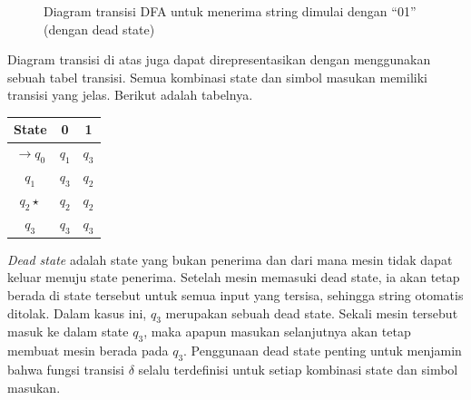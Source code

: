 \begin{figure}[H]
    \centering
    \caption{Diagram transisi DFA untuk menerima string dimulai dengan ``01'' (dengan dead state)}
    \label{fig:dfa-starts-with-01}
\end{figure}

Diagram transisi di atas juga dapat direpresentasikan dengan menggunakan sebuah tabel transisi. Semua kombinasi state dan simbol masukan memiliki transisi yang jelas. Berikut adalah tabelnya.

\begin{center}
    \small
    \setlength{\extrarowheight}{2pt}
    \begin{tabular}{|c|c|c|}
        \hline
        \textbf{State}    & \textbf{0} & \textbf{1} \\
        \hline
        $\rightarrow q_0$ & $q_1$      & $q_3$      \\
        \hline
        $q_1$             & $q_3$      & $q_2$      \\
        \hline
        $q_2\star$        & $q_2$      & $q_2$      \\
        \hline
        $q_3$             & $q_3$      & $q_3$      \\
        \hline
    \end{tabular}
\end{center}

\textit{Dead state} adalah state yang bukan penerima dan dari mana mesin tidak dapat keluar menuju state penerima. Setelah mesin memasuki dead state, ia akan tetap berada di state tersebut untuk semua input yang tersisa, sehingga string otomatis ditolak. Dalam kasus ini, $q_3$ merupakan sebuah dead state. Sekali mesin tersebut masuk ke dalam state $q_3$, maka apapun masukan selanjutnya akan tetap membuat mesin berada pada $q_3$. Penggunaan dead state penting untuk menjamin bahwa fungsi transisi $\delta$ selalu terdefinisi untuk setiap kombinasi state dan simbol masukan.


